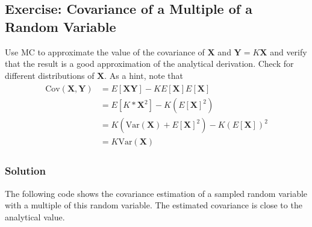 \documentclass[letterpaper,10pt,english]{jupyterBook}
\begin{document}
\subsection{Exercise: Covariance of a Multiple of a Random Variable}
\label{\detokenize{01:exercise-covariance-of-a-multiple-of-a-random-variable}}
\sphinxAtStartPar
Use MC to approximate the value of the covariance of \({\mathbf X}\) and \({\mathbf Y}=K{\mathbf X}\) and verify that the result is a good approximation of the analytical derivation. Check for different distributions of \({\mathbf X}\). As a hint, note that
\begin{equation*}
\begin{split}
\begin{align}
\mbox{Cov}({\mathbf X},{\mathbf Y})&=E[{\mathbf X}{\mathbf Y}]-K E[{\mathbf X}]E[{\mathbf X}]\\
&=E[K*{\mathbf X}^2]-K(E[{\mathbf X}]^2)\\
&=K(\mbox{Var}({\mathbf X})+E[{\mathbf X}]^2)-K (E[{\mathbf X}])^2\\
&=K\mbox{Var}({\mathbf X})
\end{align}\end{split}
\end{equation*}

\subsubsection{Solution}
\label{\detokenize{01:id7}}
\sphinxAtStartPar
The following code shows the covariance estimation of a sampled random variable with a multiple of this random variable. The estimated covariance is close to the analytical value.
\end{document}
